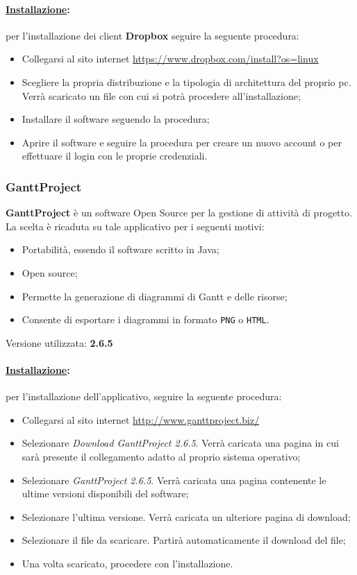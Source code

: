 \paragraph{\underline{Installazione}:} per l'installazione dei client \textbf{Dropbox} seguire la seguente procedura:
\begin{itemize}
\item Collegarsi al sito internet \url{https://www.dropbox.com/install?os=linux}
\item Scegliere la propria distribuzione e la tipologia di architettura del proprio pc. Verrà scaricato un file con cui si potrà procedere all'installazione;
\item Installare il software seguendo la procedura;
\item Aprire il software e seguire la procedura per creare un nuovo account o per effettuare il login con le proprie credenziali.
\end{itemize}

\subsubsection{GanttProject}
\label{ganttproject}
\textbf{GanttProject} è un software Open Source per la gestione di attività di progetto. La scelta è ricaduta su tale applicativo per i seguenti motivi:
\begin{itemize}
	\item Portabilità, essendo il software scritto in Java;
	\item Open source;
	\item Permette la generazione di diagrammi di Gantt\glossario{} e delle risorse;
	\item Consente di esportare i diagrammi in formato \verb!PNG! o \verb!HTML!.
\end{itemize}
Versione utilizzata: \textbf{2.6.5}

\paragraph{\underline{Installazione}:} per l'installazione dell'applicativo, seguire la seguente procedura:
\begin{itemize}
\item Collegarsi al sito internet \url{http://www.ganttproject.biz/}
\item Selezionare \textit{Download GanttProject 2.6.5}. Verrà caricata una pagina in cui sarà presente il collegamento adatto al proprio sistema operativo;
\item Selezionare \textit{GanttProject 2.6.5}. Verrà caricata una pagina contenente le ultime versioni disponibili del software;
\item Selezionare l'ultima versione. Verrà caricata un ulteriore pagina di download;
\item Selezionare il file da scaricare. Partirà automaticamente il download del file;
\item Una volta scaricato, procedere con l'installazione.
\end{itemize}


